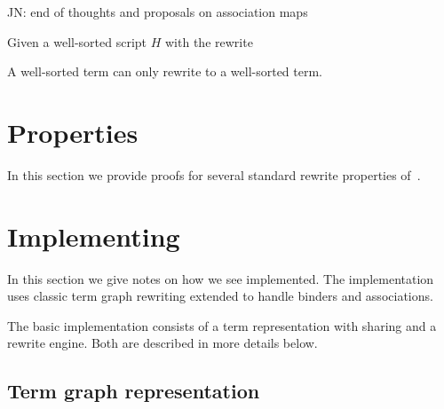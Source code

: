 \documentclass[letterpaper,11pt]{article}
\newcommand{\JN}[1]{\textcolor{orange!70!black}{JN: #1}}
\begin{document}
\JN{end of thoughts and proposals on association maps}
\bigskip

\begin{definition}[substitution]
  
\end{definition}


\begin{theorem}
  Given a well-sorted \hax script $H$ with the rewrite 


A well-sorted term can only rewrite to a well-sorted term.
\end{theorem}


\section{Properties}
\label{sec:properties}

In this section we provide proofs for several standard rewrite properties of~\hax.




\section{Implementing \hax}
\label{sec:implement}

In this section we give notes on how we see \hax implemented. The implementation uses classic term
graph rewriting extended to handle binders and associations.

The basic \hax implementation consists of a term representation with sharing and a rewrite engine. Both are described
in more details below.     


\subsection{Term graph representation}
\end{document}
